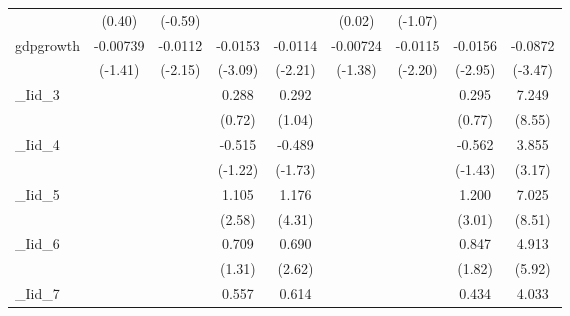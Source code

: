 {\begin{tabular}{l*{8}{c}}
            &      (0.40)         &     (-0.59)         &                     &                     &      (0.02)         &     (-1.07)         &                     &                     \\
[1em]
gdpgrowth   &    -0.00739         &     -0.0112\sym{*}  &     -0.0153\sym{**} &     -0.0114\sym{*}  &    -0.00724         &     -0.0115\sym{*}  &     -0.0156\sym{**} &     -0.0872\sym{***}\\
            &     (-1.41)         &     (-2.15)         &     (-3.09)         &     (-2.21)         &     (-1.38)         &     (-2.20)         &     (-2.95)         &     (-3.47)         \\
[1em]
\_Iid\_3      &                     &                     &       0.288         &       0.292         &                     &                     &       0.295         &       7.249\sym{***}\\
            &                     &                     &      (0.72)         &      (1.04)         &                     &                     &      (0.77)         &      (8.55)         \\
[1em]
\_Iid\_4      &                     &                     &      -0.515         &      -0.489         &                     &                     &      -0.562         &       3.855\sym{**} \\
            &                     &                     &     (-1.22)         &     (-1.73)         &                     &                     &     (-1.43)         &      (3.17)         \\
[1em]
\_Iid\_5      &                     &                     &       1.105\sym{**} &       1.176\sym{***}&                     &                     &       1.200\sym{**} &       7.025\sym{***}\\
            &                     &                     &      (2.58)         &      (4.31)         &                     &                     &      (3.01)         &      (8.51)         \\
[1em]
\_Iid\_6      &                     &                     &       0.709         &       0.690\sym{**} &                     &                     &       0.847         &       4.913\sym{***}\\
            &                     &                     &      (1.31)         &      (2.62)         &                     &                     &      (1.82)         &      (5.92)         \\
[1em]
\_Iid\_7      &                     &                     &       0.557         &       0.614\sym{*}  &                     &                     &       0.434         &       4.033\sym{***}\\

\end{tabular}}

